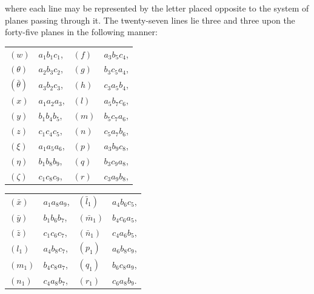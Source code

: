 \documentclass[12pt,a4paper]{article}
\begin{document}
where each line may be represented by the letter placed opposite to the system of planes passing through it. The twenty-seven lines lie three and three upon the forty-five planes in the following manner:
\medskip

\begin{center}
\begin{tabular}{llll}
$(w)$ & $a_1b_1c_1$, & $(f)$ & $a_3b_5c_4$, \\ 
$(\theta)$ & $a_2b_3c_2$, & $(g)$ & $b_3c_5a_4$, \\ 
$(\bar{\theta})$ & $a_3b_2c_3$, & $(h)$ & $c_3a_5b_4$, \\ 
$(x)$ & $a_1a_2a_3$, & $(l)$ & $a_5b_7c_6$, \\ 
$(y)$ & $b_1b_4b_5$, & $(m)$ & $b_5c_7a_6$, \\ 
$(z)$ & $c_1c_4c_5$, & $(n)$ & $c_5a_7b_6$, \\ 
$(\xi)$ & $a_1a_5a_6$, & $(p)$ & $a_3b_9c_8$, \\ 
$(\eta)$ & $b_1b_8b_9$, & $(q)$ & $b_3c_9a_8$, \\ 
$(\zeta)$ & $c_1c_8c_9$, & $(r)$ & $c_3a_9b_8$,
\end{tabular}
\end{center}

\begin{center}
\begin{tabular}{llll}
$(\bar{x})$ & $a_1a_8a_9$, & $(\bar{l}_1)$ & $a_4b_6c_5$, \\ 
$(\bar{y})$ & $b_1b_6b_7$, & $(\bar{m}_1)$ & $b_4c_6a_5$, \\ 
$(\bar{z})$ & $c_1c_6c_7$, & $(\bar{n}_1)$ & $c_4a_6b_5$, \\ 
$(l_1)$ & $a_4b_8c_7$, & $(p_1)$ & $a_6b_8c_9$, \\ 
$(m_1)$ & $b_4c_8a_7$, & $(q_1)$ & $b_6c_8a_9$, \\ 
$(n_1)$ & $c_4a_8b_7$, & $(r_1)$ & $c_6a_8b_9$.
\end{tabular}
\end{center}
\end{document}
